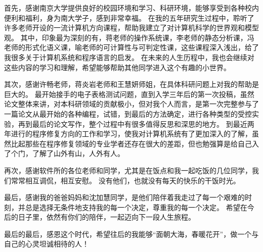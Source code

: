 \begin{acknowledgement}

首先，感谢南京大学提供良好的校园环境和学习、科研环境，能够享受到各种校内便利和福利，身为南大学子，感到非常幸福。
在我的五年研究生过程中，聆听了许多老师开设的一流计算机方向课程，帮助我建立了对计算机科学的世界观和模型观。
其中，印象最为深刻的有，蒋老师的操作系统课，李老师的静态分析课，冯老师的形式化语义课，喻老师的可计算性与可判定性课，这些课程深入浅出，给了我很多关于计算机系统和程序语言的启发。
在未来的人生历程中，我也会继续对这些内容的学习和理解，希望能够帮助其他同学进入这个有趣的小世界。

其次，感谢许畅老师，蒋炎岩老师和王慧妍师姐，在具体科研问题上对我的帮助是巨大的。
最开始接手的电子表格测试问题，直到入学三年后的第一次投稿，虽然论文整体来讲，对本科研领域的贡献极小，但对我个人而言，是第一次完整参与了一篇论文从最开始的各种编程，试错，到最后的方法确定，进行各种类型的受控实验，再到最后的论文写作，整个过程中有很多值得反思和深思的地方。
到最近两年进行的程序修复方向的工作和学习，使我对计算机系统有了更加深入的了解，虽然比起那些在程序修复领域的专业学者还存在很大的差距，但也勉强算是给自己入了个门，了解了山外有山，人外有人。

再次，感谢软件所的各位老师和同学，尤其是在饭点和我一起吃饭的几位同学，我们常常相互调侃，相互安慰。
没有他们，也就没有每天的快乐的干饭时光。

最后，感谢我的爸爸妈妈和沈加慧同学，是他们陪伴着我走过了每一个艰难的时刻，并总是选择无条件地支持我的每一个决定，尊重我的每一个决定。
希望在今后的日子里，依然有你们的陪伴，一起迈向下一段人生旅程。

最后的最后，感恩这个时代，希望往后的我能够“面朝大海，春暖花开”，做一个与自己的心灵坦诚相待的人！

\end{acknowledgement}